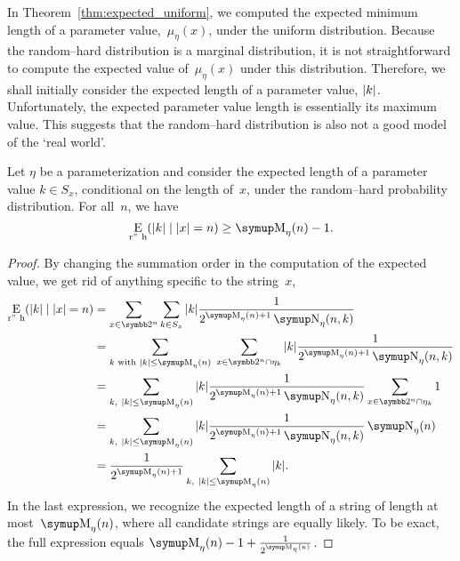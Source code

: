 In Theorem~\ref{thm:expected_uniform}, we computed the expected minimum length of a parameter value,~$\mu_\eta(x)$, under the uniform distribution.
Because the random--hard distribution is a marginal distribution, it is not straightforward to compute the expected value of~$\mu_\eta(x)$ under this distribution.
Therefore, we shall initially consider the expected length of a parameter value, ${\lvert k\rvert}$.
Unfortunately, the expected parameter value length is essentially its maximum value.
This suggests that the random--hard distribution is also not a good model of the \enquote*{real world}.
\begin{theorem}
\label{thm:expected_randomhard}%
  Let $\eta$ be a parameterization and consider the expected length of a parameter value $k \in S_x$, conditional on the length of~$x$, under the random--hard probability distribution.
  For all~$n$, we have
  \begin{equation*}
    \Ex_\mathrm{r"~h}(\length{k} \given \length{x} = n) \ge \upM_\eta(n) - 1.
  \end{equation*}
\end{theorem}
\begin{proof}
  By changing the summation order in the computation of the expected value, we get rid of anything specific to the string~$x$,
  \begin{align*}
    \Ex_\mathrm{r"~h}(\length{k} \given \length{x} = n)
      &= \sum_{x \in \binary^n} \sum_{k \in S_x} \length{k} \frac{1}{2^{\upM_\eta(n) + 1} \upN_\eta(n, k)} \\
      &= \sum_{k\text{ with }\length{k} \le \upM_\eta(n)}\;\sum_{x \in \binary^n \cap \eta_k} \length{k} \frac{1}{2^{\upM_\eta(n) + 1} \upN_\eta(n, k)} \\
      &= \sum_{k,\ \length{k} \le \upM_\eta(n)} \length{k} \frac{1}{2^{\upM_\eta(n) + 1} \upN_\eta(n, k)} \sum_{x \in \binary^n \cap \eta_k} 1 \\
      &= \sum_{k,\ \length{k} \le \upM_\eta(n)} \length{k} \frac{1}{2^{\upM_\eta(n) + 1} \upN_\eta(n, k)} \upN_\eta(n) \\
      &= \frac{1}{2^{\upM_\eta(n) + 1}} \sum_{k,\ \length{k} \le \upM_\eta(n)} \length{k}.
  \end{align*}
  In the last expression, we recognize the expected length of a string of length at most~$\upM_\eta(n)$, where all candidate strings are equally likely.
  To be exact, the full expression equals $\upM_\eta(n) - 1 + \frac{1}{2^{\upM_\eta(n)}}$.
\end{proof}

